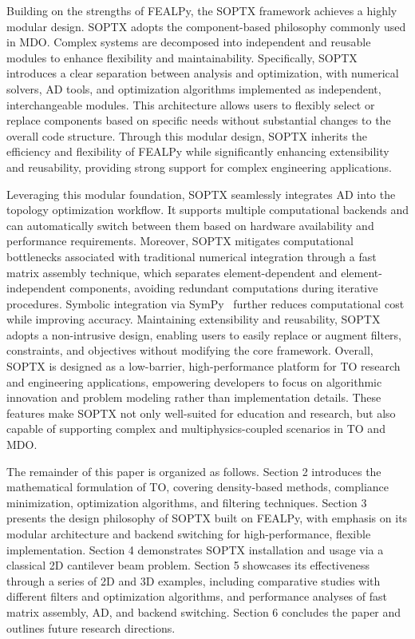 \documentclass[mathpazo]{cicp}
\begin{document}
Building on the strengths of FEALPy, the SOPTX framework achieves a highly modular design. SOPTX adopts the component-based philosophy commonly used in MDO. Complex systems are decomposed into independent and reusable modules to enhance flexibility and maintainability. Specifically, SOPTX introduces a clear separation between analysis and optimization, with numerical solvers, AD tools, and optimization algorithms implemented as independent, interchangeable modules. This architecture allows users to flexibly select or replace components based on specific needs without substantial changes to the overall code structure. Through this modular design, SOPTX inherits the efficiency and flexibility of FEALPy while significantly enhancing extensibility and reusability, providing strong support for complex engineering applications.

Leveraging this modular foundation, SOPTX seamlessly integrates AD into the topology optimization workflow. It supports multiple computational backends and can automatically switch between them based on hardware availability and performance requirements. Moreover, SOPTX mitigates computational bottlenecks associated with traditional numerical integration through a fast matrix assembly technique, which separates element-dependent and element-independent components, avoiding redundant computations during iterative procedures. Symbolic integration via SymPy~\cite{unknown} further reduces computational cost while improving accuracy. Maintaining extensibility and reusability, SOPTX adopts a non-intrusive design, enabling users to easily replace or augment filters, constraints, and objectives without modifying the core framework. Overall, SOPTX is designed as a low-barrier, high-performance platform for TO research and engineering applications, empowering developers to focus on algorithmic innovation and problem modeling rather than implementation details. These features make SOPTX not only well-suited for education and research, but also capable of supporting complex and multiphysics-coupled scenarios in TO and MDO.

The remainder of this paper is organized as follows. Section 2 introduces the mathematical formulation of TO, covering density-based methods, compliance minimization, optimization algorithms, and filtering techniques. Section 3 presents the design philosophy of SOPTX built on FEALPy, with emphasis on its modular architecture and backend switching for high-performance, flexible implementation. Section 4 demonstrates SOPTX installation and usage via a classical 2D cantilever beam problem. Section 5 showcases its effectiveness through a series of 2D and 3D examples, including comparative studies with different filters and optimization algorithms, and performance analyses of fast matrix assembly, AD, and backend switching. Section 6 concludes the paper and outlines future research directions.
\end{document}
